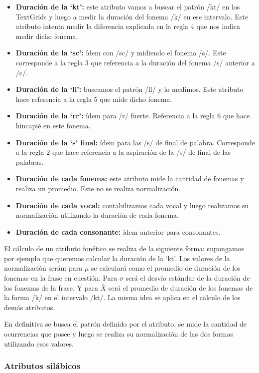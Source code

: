 \begin{itemize}
    \item \textbf{Duración de la `kt’:} este atributo vamos a buscar el patrón /kt/ en los TextGrids y luego a medir la duración del fonema /k/ en ese intervalo. Este atributo intenta medir la diferencia explicada en la regla 4 que nos indica medir dicho fonema.
    \item \textbf{Duración de la `sc’:} ídem con /sc/ y midiendo el fonema /s/. Este corresponde a la regla 3 que referencia a la duración del fonema /s/ anterior a /c/.  
    \item \textbf{Duración de la `ll’:} buscamos el patrón /ll/ y lo medimos. Este atributo hace referencia a la regla 5 que mide dicho fonema.
    \item \textbf{Duración de la `rr’:} ídem para /r/ fuerte. Referencia a la regla 6 que hace hincapié en este fonema.
    \item \textbf{Duración de la `s’ final:} ídem para las /s/ de final de palabra. Corresponde a la regla 2 que hace referencia a la aspiración de la /s/ de final de las palabras.  
    \item \textbf{Duración de cada fonema:} este atributo mide la cantidad de fonemas y realiza un promedio. Este no se realiza normalización.  
    \item \textbf{Duración de cada vocal:} contabilizamos cada vocal y luego realizamos su normalización utilizando la duración de cada fonema.
    \item \textbf{Duración de cada consonante:} ídem anterior para consonantes. 
\end{itemize}

El cálculo de un atributo fonético se realiza de la siguiente forma: supongamos por ejemplo que queremos calcular la duración de la `kt’. Los valores de la normalización serán: para $\mu$ se calculará como el promedio de duración de los fonemas en la frase en cuestión. Para $\sigma$ será el desvío estándar de la duración de los fonemas de la frase. Y para $\bar{X}$ será el promedio de duración de los fonemas de la forma /k/ en el intervalo /kt/. La misma idea se aplica en el calculo de los demás atributos.

En definitiva se busca el patrón definido por el atributo, se mide la cantidad de ocurrencias que posee y luego se realiza su normalización de las dos formas utilizando esos valores. 

\subsubsection{Atributos silábicos}

